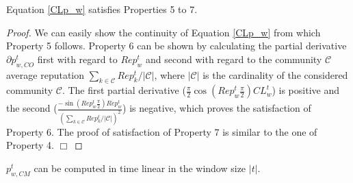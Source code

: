 \begin{theorem}
Equation  \ref{CLp_w} satisfies Properties 5 to 7.
\end{theorem}
%
\begin{proof}
We can easily show the continuity  of Equation \ref{CLp_w} from
which Property 5 follows. Property 6 can be shown by calculating
the partial derivative $\partial p_{w,CO}^t$ first with regard to
$Rep^t_w$ and second with regard to the community $\mathcal{C}$
average reputation $\sum_{k\in \mathcal{C}}Rep^t_k/|\mathcal{C}|$,
where $|\mathcal{C}|$ is the cardinality of the considered
community $\mathcal{C}$. The first partial derivative
($\frac{\pi}{2}\cos(Rep^t_w\frac{\pi}{2})CL_w^t$) is positive and
the second ($\frac{-\sin(Rep^t_w\frac{\pi}{2})Rep^t_w}{(\sum_{k\in
\mathcal{C}}Rep^t_k/|\mathcal{C}|)^2}$) is negative, which proves
the satisfaction of Property 6. The proof of satisfaction of
Property 7 is similar to the one of Property 4. $\Box$
\end{proof}


%
%



\begin{proposition}\label{Complexity-Probability_Competition}
$p_{w,CM}^t$ can be computed in time linear in the window size
$|t|$.
\end{proposition}

